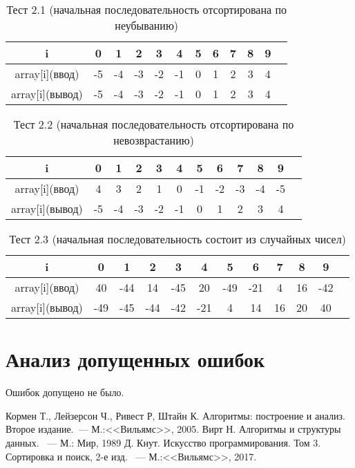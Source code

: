 \documentclass[a4paper,12pt,titlepage,finall]{article}
\begin{document}
\begin{table}[h]
\centering
\begin{tabular}{|c|c|c|c|c|c|c|c|c|c|c|c|}
    \hline
    i & 0 & 1 & 2 & 3 & 4 & 5 & 6 & 7 & 8 & 9\\
    \hline
     array[i](ввод) & -5 & -4 & -3 & -2 & -1 & 0 & 1 & 2 & 3 & 4 \\
    \hline
     array[i](вывод) & -5 & -4 & -3 & -2 & -1 & 0 & 1 & 2 & 3 & 4 \\
    \hline
\end{tabular}
\caption{Тест 2.1 (начальная последовательность отсортирована по неубыванию)}
\end{table}

\begin{table}[h]
\centering
\begin{tabular}{|c|c|c|c|c|c|c|c|c|c|c|c|}
    \hline
    i & 0 & 1 & 2 & 3 & 4 & 5 & 6 & 7 & 8 & 9\\
    \hline
     array[i](ввод) & 4 & 3 & 2 & 1 & 0 & -1 & -2 & -3 & -4 & -5 \\
    \hline
     array[i](вывод) & -5 & -4 & -3 & -2 & -1 & 0 & 1 & 2 & 3 & 4 \\
    \hline
\end{tabular}
\caption{Тест 2.2 (начальная последовательность отсортирована по невозврастанию)}
\end{table}

\begin{table}[h]
\centering
\begin{tabular}{|c|c|c|c|c|c|c|c|c|c|c|c|}
    \hline
    i & 0 & 1 & 2 & 3 & 4 & 5 & 6 & 7 & 8 & 9\\
    \hline
     array[i](ввод) & 40 & -44 & 14 & -45 & 20 & -49 & -21 & 4 & 16 & -42 \\
    \hline
     array[i](вывод) & -49 & -45 & -44 & -42 & -21 & 4 & 14 & 16 & 20 & 40 \\
    \hline
\end{tabular}
\caption{Тест 2.3 (начальная последовательность состоит из случайных чисел)}
\end{table}

\clearpage

\newpage

\section{Анализ допущенных ошибок}

Ошибок допущено не было.

\newpage
\begin{raggedright}
\begin{thebibliography}{99}
 Кормен Т., Лейзерсон Ч., Ривест Р, Штайн К. Алгоритмы: построение и анализ.
    Второе издание.~--- М.:<<Вильямс>>, 2005.
 Вирт Н. Алгоритмы и структуры данных. ~--- М.: Мир, 1989
 Д. Кнут. Искусство программирования. Том 3. Сортировка и поиск, 2-е изд. ~--- М.:<<Вильямс>>, 2017.
\end{thebibliography}
\end{raggedright}
\end{document}
